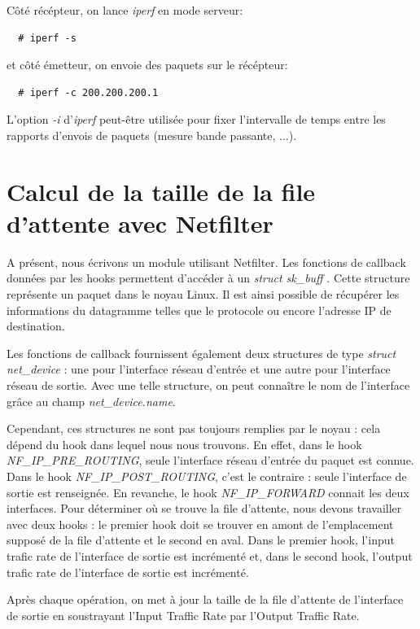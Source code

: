 \documentclass[a4paper]{article}
\begin{document}
Côté récépteur, on lance \textit{iperf} en mode serveur:
\begin{verbatim}
  # iperf -s
\end{verbatim}

et côté émetteur, on envoie des paquets sur le récépteur:
\begin{verbatim}
  # iperf -c 200.200.200.1
\end{verbatim}

L'option \textit{-i} d'\textit{iperf} peut-être utilisée
pour fixer l'intervalle de temps entre les rapports
d'envois de paquets (mesure bande passante, $\ldots$).

\section{Calcul de la taille de la file d'attente avec Netfilter}
A présent, nous écrivons un module utilisant Netfilter. Les
fonctions de callback données par les hooks permettent
d'accéder à un \textit{struct sk\_buff} \cite{skbuff}. Cette structure représente
un paquet dans le noyau Linux. Il est ainsi possible de récupérer
les informations du datagramme telles que le protocole ou encore
l'adresse IP de destination.

Les fonctions de callback fournissent également deux structures
de type \textit{struct net\_device} : une pour l'interface réseau
d'entrée et une autre pour l'interface réseau de sortie. Avec
une telle structure, on peut connaître le nom de l'interface
grâce au champ \textit{net\_device.name}.

Cependant, ces structures ne sont pas toujours remplies par le noyau : cela 
dépend du hook dans lequel nous nous trouvons. En effet, dans le hook \textit{NF\_IP\_PRE\_ROUTING}, 
seule l'interface réseau d'entrée du paquet est connue. Dans le hook \textit{NF\_IP\_POST\_ROUTING}, 
c'est le contraire : seule l'interface de sortie est renseignée. En revanche, le hook \textit{NF\_IP\_FORWARD} 
connait les deux interfaces.
Pour déterminer où se trouve la file d'attente, nous devons travailler avec deux hooks : 
le premier hook doit se trouver en amont de l'emplacement supposé de la file d'attente et le second en aval. 
Dans le premier hook, l'input trafic rate de l'interface de sortie est incrémenté et, dans le second hook, 
l'output trafic rate de l'interface de sortie est incrémenté.
 
Après chaque opération, on met à jour la taille de la file
d'attente de l'interface de sortie en soustrayant l'Input Traffic
Rate par l'Output Traffic Rate.
\end{document}
